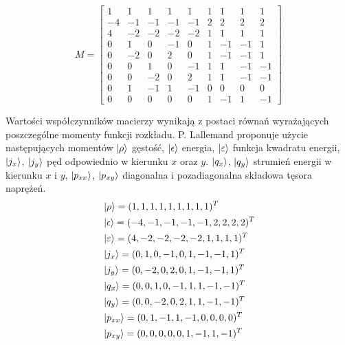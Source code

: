 \documentclass[a4paper,11pt,twoside]{article}
\begin{document}
\begin{equation}
M = 
\begin{bmatrix}
			1 & 1 & 1 & 1 & 1 & 1 & 1 & 1 & 1	\\
			-4 & -1 & -1 & -1 & -1 & 2 & 2 & 2 & 2	\\
			4 & -2 &-2 & -2 & -2 & 1 & 1 & 1 & 1	\\
			0 & 1 & 0 & -1 & 0 & 1 & -1 & -1 & 1	\\
			0 & -2 & 0 & 2 & 0 & 1 & -1 & -1 & 1	\\
			0 &  0 & 1 & 0 & -1 & 1 & 1 &-1 & -1	\\
            0 & 0 & -2 & 0 & 2 & 1 & 1 & -1 & -1	\\
			0 & 1 & -1 & 1 & -1 & 0 & 0 & 0 & 0	\\
			0 & 0 & 0 & 0 & 0 & 1 & -1 & 1 & -1
\end{bmatrix}
\end{equation}
            
Wartości współczynników macierzy wynikają z postaci równań wyrażających poszczególne momenty funkcji rozkładu. P. Lallemand \cite{MRT} proponuje użycie następujących momentów $\ket{\rho} $ gęstość,  $\ket{\epsilon}$ energia, $\ket{\varepsilon}$ funkcja kwadratu energii, $\ket{j_x}$, $\ket{j_y}$ pęd odpowiednio w kierunku $x$ oraz $y$. $\ket{q_x}$, $\ket{q_y}$ strumień energii w kierunku $x$ i $y$, $\ket{p_{xx}}$, $\ket{p_{xy}}$ diagonalna i pozadiagonalna składowa tęsora naprężeń.
\begin{eqnarray}
&\ket{\rho} = (1, 1, 1, 1, 1, 1, 1, 1, 1)^T		\\
&\ket{\epsilon} = (-4, -1 , -1 , -1 , -1 , 2 , 2 , 2 , 2)^T\\
&\ket{\varepsilon} =(4 , -2 ,-2 , -2 , -2 , 1 , 1 , 1 , 1)^T 	\\
&\ket{j_x} = (0 , 1 , 0 , -1 , 0 , 1 , -1 , -1 , 1)^T \\
&\ket{j_y} = (0 , -2 , 0 , 2 , 0 , 1 , -1 , -1 , 1)^T\\
&\ket{q_x} = (0 ,  0 , 1 , 0 , -1 , 1 , 1 ,-1 , -1)^T \\
&\ket{q_y} = (0 , 0 , -2 , 0 , 2 , 1 , 1 , -1 , -1)^T \\ 
&\ket{p_{xx}} =(0 , 1 , -1 , 1 , -1 , 0 , 0 , 0 , 0)^T \\ 
&\ket{p_{xy}} = (0 , 0 , 0 , 0 , 0 , 1 , -1 , 1 , -1)^T
\end{eqnarray}
\end{document}
